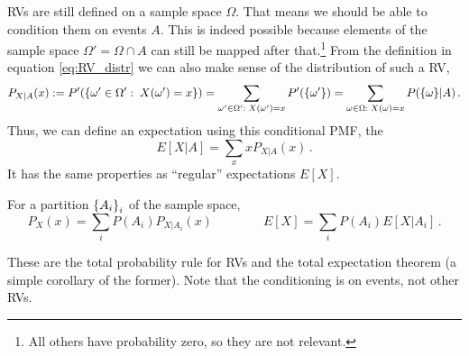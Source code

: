 RVs are still defined on a sample space $\Omega$. That means we should be able to condition them on events $A$. This is indeed possible because elements of the sample space $\Omega' = \Omega \cap A$ can still be mapped after that.\footnote{All others have probability zero, so they are not relevant.} From the definition in equation \eqref{eq:RV_distr} we can also make sense of the distribution of such a RV,
\begin{equation}
P_{X | A}(x) := P'(\qty{\omega' \in \Omega': \; X(\omega') = x}) = \sum_{\omega' \in \Omega': \; X(\omega') = x} P'(\qty{\omega'}) = \sum_{\omega \in \Omega: \; X(\omega) = x} P(\{\omega\} | A) \, .
\end{equation}
Thus, we can define an expectation using this conditional PMF, the 
\begin{equation}
E[X | A] = \sum_x x P_{X | A}(x) \, .
\end{equation}
It has the same properties as \enquote{regular} expectations $E[X]$.


\begin{prop}
For a partition $\qty{A_i}_i$ of the sample space,
\begin{equation}
P_X(x) = \sum_i P(A_i) P_{X | A_i}(x) \qquad \qquad E[X] = \sum_i P(A_i) E[X | A_i] \, .
\end{equation}
\end{prop}
These are the total probability rule for RVs and the total expectation theorem (a simple corollary of the former). Note that the conditioning is on events, not other RVs.


